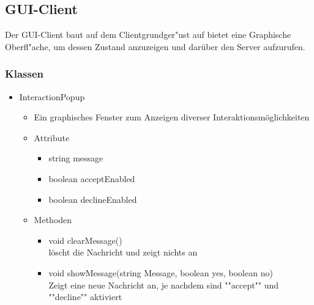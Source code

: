 \documentclass[a4paper,10pt]{article}
\begin{document}
\subsection{GUI-Client}

Der GUI-Client baut auf dem Clientgrundger"ust auf bietet eine Graphische Oberfl"ache, um dessen Zustand anzuzeigen und darüber den Server aufzurufen.

\subsubsection{Klassen}

\begin{itemize}
\item InteractionPopup
\begin{itemize}
\item Ein graphisches Fenster zum Anzeigen diverser Interaktionsmöglichkeiten
\item Attribute
\begin{itemize}
\item string message
\item boolean acceptEnabled
\item boolean declineEnabled
\end{itemize}
\item Methoden
\begin{itemize}
\item void clearMessage() 
\\löscht die Nachricht und zeigt nichts an
\item void showMessage(string Message, boolean yes, boolean no)
\\Zeigt eine neue Nachricht an, je nachdem sind ""accept"" und ""decline"" aktiviert
\end{itemize}
\end{itemize}


\end{itemize}
\end{document}

